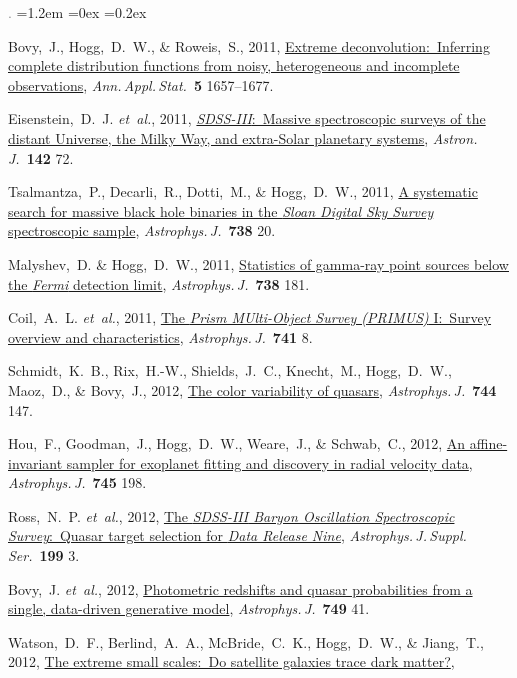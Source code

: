 \documentclass[10pt,letterpaper]{article}
\newcommand{\acronym}[1]{{\small{#1}}}
\newcommand{\foreign}[1]{\textsl{#1}}
\newcommand{\etal}{\foreign{et~al.}}
\newcommand{\project}[1]{\textsl{#1}}
\newcommand{\doi}[2]{\href{http://dx.doi.org/#1}{{#2}}}
\newcommand{\deemph}[1]{\textcolor{grey}{\footnotesize{#1}}}
\newcommand{\pubnumber}[1]{\deemph{{#1}.}}
\newcounter{refpubnum}
\newcommand{\hogglist}{%
    \rightmargin=0in
    \leftmargin=1.2em
    \topsep=0ex
    \partopsep=0pt
    \itemsep=0.2ex
    \parsep=0pt
    \itemindent=-1.0\leftmargin
    \listparindent=0.0\leftmargin
    \settowidth{\labelsep}{~}
    \usecounter{refpubnum}
  }
\begin{document}
\begin{list}{\pubnumber{\therefpubnum}}{\hogglist}
\item
Bovy,~J., Hogg,~D.~W., \& Roweis,~S., 2011,
\doi{10.1214/10-AOAS439}{Extreme deconvolution:\ Inferring complete distribution functions from noisy, heterogeneous and incomplete observations},
\textit{Ann.\,Appl.\,Stat.}\ \textbf{5} 1657--1677.
\item
Eisenstein,~D.~J. \etal, 2011,
\doi{10.1088/0004-6256/142/3/72}{\project{\acronym{SDSS-III}}:\ Massive spectroscopic surveys of the distant Universe, the Milky Way, and extra-Solar planetary systems},
\textit{Astron.\,J.}\ \textbf{142} 72.
\item
Tsalmantza,~P., Decarli,~R., Dotti,~M., \& Hogg,~D.~W., 2011,
\doi{10.1088/0004-637X/738/1/20}{A systematic search for massive black hole binaries in the \project{Sloan Digital Sky Survey} spectroscopic sample},
\textit{Astrophys.\,J.}\ \textbf{738} 20.
\item
Malyshev,~D. \& Hogg,~D.~W., 2011,
\doi{10.1088/0004-637X/738/2/181}{Statistics of gamma-ray point sources below the \project{Fermi} detection limit},
\textit{Astrophys.\,J.}\ \textbf{738} 181.
\item
Coil,~A.~L. \etal, 2011,
\doi{10.1088/0004-637X/741/1/8}{The \project{Prism MUlti-Object Survey (\acronym{PRIMUS})} I:\ Survey overview and characteristics},
\textit{Astrophys.\,J.}\ \textbf{741} 8.
\item
Schmidt,~K.~B., Rix,~H.-W., Shields,~J.~C., Knecht,~M., Hogg,~D.~W., Maoz,~D., \& Bovy,~J., 2012,
\doi{10.1088/0004-637X/744/2/147}{The color variability of quasars}, 
\textit{Astrophys.\,J.}\ \textbf{744} 147.
\item
Hou,~F., Goodman,~J., Hogg,~D.~W., Weare,~J., \& Schwab,~C., 2012,
\doi{10.1088/0004-637X/745/2/198}{An affine-invariant sampler for exoplanet fitting and discovery in radial velocity data},
\textit{Astrophys.\,J.}\ \textbf{745} 198.
\item
Ross,~N.~P. \etal, 2012,
\doi{10.1088/0067-0049/199/1/3}{The \project{\acronym{SDSS-III} Baryon Oscillation Spectroscopic Survey}:\ Quasar target selection for \project{Data Release Nine}},
\textit{Astrophys.\,J.\,Suppl.\,Ser.}\ \textbf{199} 3.
\item
Bovy,~J. \etal, 2012,
\doi{10.1088/0004-637X/749/1/41}{Photometric redshifts and quasar probabilities from a single, data-driven generative model},
\textit{Astrophys.\,J.}\ \textbf{749} 41.
\item
Watson,~D.~F., Berlind,~A.~A., McBride,~C.~K., Hogg,~D.~W., \& Jiang,~T., 2012,
\doi{10.1088/0004-637X/749/1/83}{The extreme small scales:\ Do satellite galaxies trace dark matter?},

\end{list}
\end{document}
